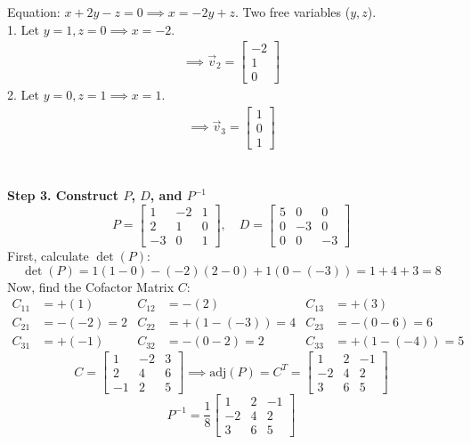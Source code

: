 \documentclass{article}
\begin{document}
Equation: $x + 2y - z = 0 \implies x = -2y + z$.
Two free variables ($y, z$). \\
1. Let $y=1, z=0 \implies x = -2$.
\begin{align*}
	\implies \vec{v}_2 = \begin{bmatrix} -2 \\ 1 \\ 0 \end{bmatrix}
\end{align*}
2. Let $y=0, z=1 \implies x = 1$.
\begin{align*}
	\implies \vec{v}_3 = \begin{bmatrix} 1 \\ 0 \\ 1 \end{bmatrix}
\end{align*}
\\
\\
\textbf{Step 3. Construct $P$, $D$, and $P^{-1}$}
\[
	P = \begin{bmatrix} 1 & -2 & 1 \\ 2 & 1 & 0 \\ -3 & 0 & 1 \end{bmatrix}, \quad D = \begin{bmatrix} 5 & 0 & 0 \\ 0 & -3 & 0 \\ 0 & 0 & -3 \end{bmatrix}
\]
First, calculate $\det(P)$:
\[
	\det(P) = 1(1-0) - (-2)(2-0) + 1(0 - (-3)) = 1 + 4 + 3 = 8
\]
Now, find the Cofactor Matrix $C$:
\begin{align*}
	C_{11} & = +(1)      & C_{12} & = -(2)          & C_{13} & = +(3)          \\
	C_{21} & = -(-2) = 2 & C_{22} & = +(1-(-3)) = 4 & C_{23} & = -(0-6) = 6    \\
	C_{31} & = +(-1)     & C_{32} & = -(0-2) = 2    & C_{33} & = +(1-(-4)) = 5
\end{align*}
\[
	C = \begin{bmatrix} 1 & -2 & 3 \\ 2 & 4 & 6 \\ -1 & 2 & 5 \end{bmatrix} \implies \text{adj}(P) = C^T = \begin{bmatrix} 1 & 2 & -1 \\ -2 & 4 & 2 \\ 3 & 6 & 5 \end{bmatrix}
\]
\[
	P^{-1} = \frac{1}{8} \begin{bmatrix} 1 & 2 & -1 \\ -2 & 4 & 2 \\ 3 & 6 & 5 \end{bmatrix}
\]
\end{document}
